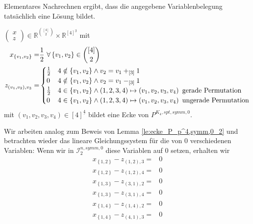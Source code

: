 \documentclass[10p,a4paper,BCOR = 12mm, DIV=15]{scrbook}
\begin{document}
{\begin{bew}
Elementares Nachrechnen ergibt, dass die angegebene Variablenbelegung tatsächlich eine Lösung bildet.
\end{bew}

\begin{Le}
\label{le:ecke_P_p^4,symm,0_2}
$\left(
\begin{array}{c}
x \\
z
\end{array}
\right)\in \mathbb{R}^{[4]\choose 2}\times \mathbb{R}^{[4]^{\underline{3}}}$ mit
\begin{align*}
x_{\left\{v_1, v_2\right\}} = & \frac{1}{2}\ \forall \left\{v_1, v_2\right\}\in {[4]\choose 2} \\
z_{\left(v_1, v_2\right), v_3} = & \begin{cases}
\frac{1}{2} & 4 \notin \left\{v_1, v_2\right\} \wedge v_2 = v_1 +_{\left[3\right]} 1 \\
0 & 4 \notin \left\{v_1, v_2\right\} \wedge v_2 = v_1 -_{\left[3\right]} 1 \\
\frac{1}{2} & 4 \in \left\{v_1, v_2\right\} \wedge \left(1, 2, 3, 4\right) \mapsto \left(v_1, v_2, v_3, v_4\right)\textnormal{ gerade Permutation} \\
0 & 4 \in \left\{v_1, v_2\right\} \wedge \left(1, 2, 3, 4\right) \mapsto \left(v_1, v_2, v_3, v_4\right)\textnormal{ ungerade Permutation}
\end{cases}
\end{align*}
mit $\left(v_1, v_2, v_3, v_4\right) \in \left[4\right]^{\underline{4}}$ bildet eine Ecke von $P^{K_4, spt, symm, 0}$.
\end{Le}
\begin{bew}
Wir arbeiten analog zum Beweis von Lemma \ref{le:ecke_P_p^4,symm,0_2} und betrachten wieder das lineare Gleichungssystem für die von $0$ verschiedenen Variablen:
Wenn wir in $\mathcal{I}^{n, symm, 0}_2$ diese Variablen auf $0$ setzen, erhalten wir
{
\allowdisplaybreaks
\begin{align*}
x_{\left\{1, 2\right\}} - z_{\left(1, 2\right), 3} = & 0 \\
x_{\left\{1, 2\right\}} - z_{\left(1, 2\right), 4} = & 0 \\
x_{\left\{1, 3\right\}} - z_{\left(3, 1\right), 2} = & 0 \\
x_{\left\{1, 3\right\}} - z_{\left(3, 1\right), 4} = & 0 \\
x_{\left\{1, 4\right\}} - z_{\left(1, 4\right), 2} = & 0 \\
x_{\left\{1, 4\right\}} - z_{\left(4, 1\right), 3} = & 0 \\

\end{align*}}
\end{bew}}
\end{document}

